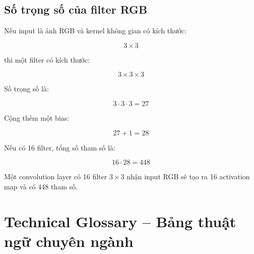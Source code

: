 \subsection{Số trọng số của filter RGB}

Nếu input là ảnh RGB và kernel không gian có kích thước:

\[
3\times3
\]

thì một filter có kích thước:

\[
3\times3\times3
\]

Số trọng số là:

\[
3\cdot3\cdot3=27
\]

Cộng thêm một bias:

\[
27+1=28
\]

Nếu có 16 filter, tổng số tham số là:

\[
16\cdot28=448
\]

\begin{vidu}
Một convolution layer có 16 filter $3\times3$ nhận input RGB sẽ tạo ra 16 activation map và có 448 tham số.
\end{vidu}

\section{Technical Glossary -- Bảng thuật ngữ chuyên ngành}

